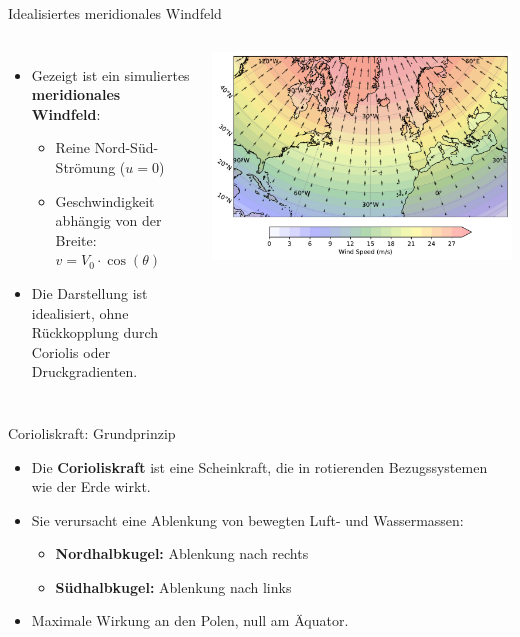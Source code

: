 \begin{frame}{Idealisiertes meridionales Windfeld}
	\begin{columns}
		\begin{itemize}
			\item Gezeigt ist ein simuliertes \textbf{meridionales Windfeld}:
			      \begin{itemize}
				      \item Reine Nord-Süd-Strömung (\(u = 0\))
				      \item Geschwindigkeit abhängig von der Breite: \(v = V_0 \cdot \cos(\theta)\)
			      \end{itemize}
			\item Die Darstellung ist idealisiert, ohne Rückkopplung durch Coriolis oder Druckgradienten.
		\end{itemize}


		\includegraphics[width=\linewidth]{../images/meridional_wind_plot.pdf}

	\end{columns}
\end{frame}



\begin{frame}{Corioliskraft: Grundprinzip}
	\begin{itemize}
		\item Die \textbf{Corioliskraft} ist eine Scheinkraft, die in rotierenden Bezugssystemen wie der Erde wirkt.
		\item Sie verursacht eine Ablenkung von bewegten Luft- und Wassermassen:
		      \begin{itemize}
			      \item \textbf{Nordhalbkugel:} Ablenkung nach rechts
			      \item \textbf{Südhalbkugel:} Ablenkung nach links
		      \end{itemize}
		\item Maximale Wirkung an den Polen, null am Äquator.
	\end{itemize}
\end{frame}

